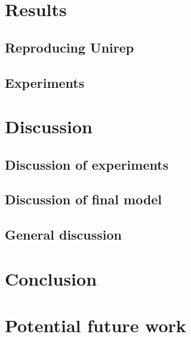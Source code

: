 \documentclass[a4paper]{article}
\begin{document}
\section{Results}
\subsection{Reproducing Unirep}
\subsection{Experiments}

\section{Discussion}
\subsection{Discussion of experiments}
\subsection{Discussion of final model}
\subsection{General discussion}

\section{Conclusion}

\section{Potential future work}



{}

\end{document}
